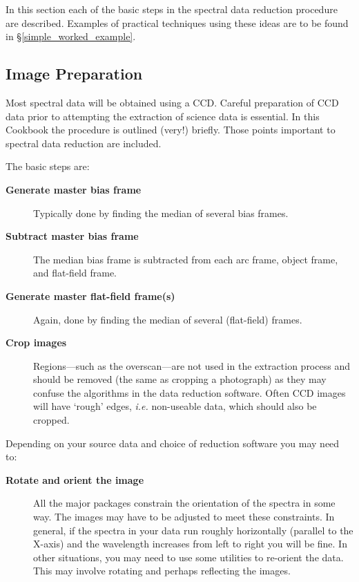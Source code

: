 \documentclass[twoside,11pt]{article}
\newcommand{\htmlref}[2]{#1}
\newcommand{\xlabel}[1]{}
\newcommand{\mlabel}[1]{\xlabel{#1}\label{#1}}
\newcommand{\scspec}[2]{#1}
\newcommand{\scspec}[2]{#2}
\begin{document}
In this section each of the basic steps in the spectral data reduction
procedure are described.
Examples of practical techniques using these ideas are to be found
in \scspec{\S\ref{simple_worked_example}}
{\htmlref{A 1-D Worked Example}{simple_worked_example}}.


\subsection{\mlabel{image_preparation}Image Preparation}

Most spectral data will be obtained using a \htmlref{CCD}{gl_ccd}.
Careful preparation of CCD data prior to attempting the extraction of
science data is essential.
In this Cookbook the procedure is outlined (very!) briefly.
Those points important to spectral data reduction are included.

The basic steps are:

\begin{description}

\item [{\bf Generate master \htmlref{bias frame}{gl_bias_frame}}]
      Typically done by finding the median of several bias frames.

\item [{\bf Subtract master bias frame}]
      The median bias frame is subtracted from each arc frame,
      object frame, and flat-field frame.

\item [{\bf Generate master \htmlref{flat-field frame(s)}{gl_flat_field}}]
      Again, done by finding the median of several (flat-field) frames.

\item [{\bf Crop images}]
      Regions\scspec{---}{ - }such as the overscan\scspec{---}{ - }are
      not used in the extraction process and should be removed (the same
      as cropping a photograph) as they may confuse the algorithms in
      the data reduction software.
      Often CCD images will have `rough' edges, {\em i.e.} non-useable
      data, which should also be cropped.

\end{description}

Depending on your source data and choice of reduction software you may
need to:

\begin{description}

\item [{\bf Rotate and orient the image}]
      All the major packages constrain the orientation of the spectra
      in some way.
      The images may have to be adjusted to meet these constraints.
      In general, if the spectra in your data run roughly
      horizontally (parallel to the X-axis) and the wavelength increases
      from left to right you will be fine.
      In other situations, you may need to use some utilities to
      re-orient the data.
      This may involve rotating and perhaps reflecting the images.

\end{description}
\end{document}
